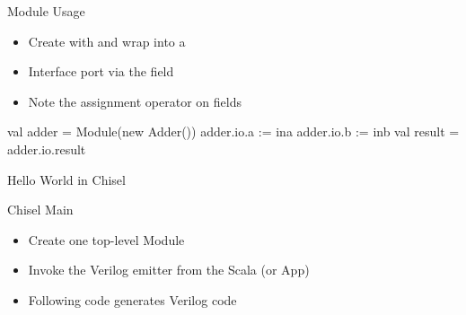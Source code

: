 \begin{frame}[fragile]{Module Usage}
\begin{itemize}
\item Create with  and wrap into a 
\item Interface port via the  field
\item Note the assignment operator \code{:=} on  fields
\end{itemize}
\begin{chisel}
  val adder = Module(new Adder())
  adder.io.a := ina
  adder.io.b := inb
  val result = adder.io.result
\end{chisel}
\end{frame}

%
%
%
%
%

\begin{frame}[fragile]{Hello World in Chisel}
\end{frame}

\begin{frame}[fragile]{Chisel Main}

\begin{itemize}
\item Create one top-level Module
\item Invoke the Verilog emitter from the Scala  (or App)
\item Following code generates Verilog code
\end{itemize}
\end{frame}

